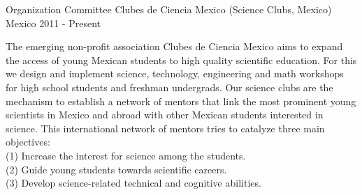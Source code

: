 

\begin{cventries}

  \cventry
    {Organization Committee} %
    {Clubes de Ciencia Mexico (Science Clubs, Mexico)} %
    {Mexico} %
    {2011 - Present} %
    {
      \begin{cvitems} %
        \item {The emerging non-profit association Clubes de Ciencia Mexico
        aims to expand the access of young Mexican students to high quality
        scientific education. For this we design and implement science,
        technology, engineering and math workshops for high school students and
        freshman undergrads. Our science clubs are the mechanism to establish a
        network of mentors that link the most prominent young scientists in
        Mexico and abroad with other Mexican students interested in science.
        This international network of mentors tries to catalyze three main
        objectives:\\
        (1) Increase the interest for science among the students.\\
        (2) Guide young students towards scientific careers.\\
        (3) Develop science-related technical and cognitive abilities.}
      \end{cvitems}
    }
\end{cventries}
